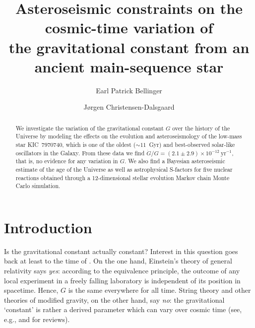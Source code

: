 \documentclass[twocolumn]{aastex63}
\begin{document}
\title{\normalfont Asteroseismic constraints on the cosmic-time variation of \\the gravitational constant from an ancient main-sequence star}


\author[0000-0003-4456-4863]{Earl Patrick Bellinger} 

\author[0000-0001-5137-0966]{J{\o}rgen Christensen-Dalsgaard} 

\begin{abstract} 
    We investigate the variation of the gravitational constant $G$ over the history of the Universe by modeling the effects on the evolution and asteroseismology of the low-mass star KIC~7970740, which is one of the oldest ($\sim 11$~Gyr) and best-observed solar-like oscillators in the Galaxy. 
    From these data we find ${\dot{G}/G = (2.1 \pm 2.9) \times 10^{-12}~\text{yr}^{-1}}$, that is, no evidence for any variation in $G$. 
    We also find a Bayesian asteroseismic estimate of the age of the Universe as well as astrophysical S-factors for five nuclear reactions obtained through a 12-dimensional stellar evolution Markov chain Monte Carlo simulation. 
\end{abstract}


\section{Introduction} \label{sec:intro} 
Is the gravitational constant actually constant? 
Interest in this question goes back at least to the time of \citet{1937Natur.139..323D}. 
On the one hand, Einstein's theory of general relativity says \emph{yes}: according to the equivalence principle, the outcome of any local experiment in a freely falling laboratory is independent of its position in spacetime. 
Hence, $G$ is the same everywhere for all time. 
String theory and other theories of modified gravity, on the other hand, say \emph{no}: the gravitational `constant' is rather a derived parameter which can vary over cosmic time (see, e.g., \citealt{2003RvMP...75..403U, Uzan2011} and \citealt{2011PThPh.126..993C} for reviews). 
\end{document}
